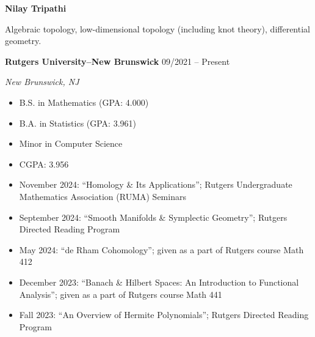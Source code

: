 \documentclass{article}
\begin{document}
		\begin{center}
				\LARGE \textbf{Nilay Tripathi}
		\end{center}
		
		\begin{multicols}{2}
				 \par 
				 \par 
		\end{multicols}		

		\vspace{1.0em}

		\noindent Algebraic topology, low-dimensional topology (including knot theory), differential geometry.

		\vspace{1.0em}

		\noindent \textbf{Rutgers University--New Brunswick} \hfill 09/2021 -- Present \par 
		\noindent \textit{New Brunswick, NJ} 
		\begin{itemize}[noitemsep, nolistsep]
				\item B.S. in Mathematics (GPA: 4.000) 
				\item B.A. in Statistics (GPA: 3.961)
				\item Minor in Computer Science 
				\item CGPA: 3.956
		\end{itemize}
		\vspace{1.0em}

		\begin{itemize}
				\item November 2024: ``Homology \& Its Applications''; Rutgers Undergraduate Mathematics Association (RUMA) Seminars 
				\item September 2024: ``Smooth Manifolds \& Symplectic Geometry''; Rutgers Directed Reading Program 
				\item May 2024: ``de Rham Cohomology''; given as a part of Rutgers course Math 412 
				\item December 2023: ``Banach \& Hilbert Spaces: An Introduction to Functional Analysis''; given as a part of Rutgers course Math 441
				\item Fall 2023: ``An Overview of Hermite Polynomials''; Rutgers Directed Reading Program
		\end{itemize}
\end{document}
